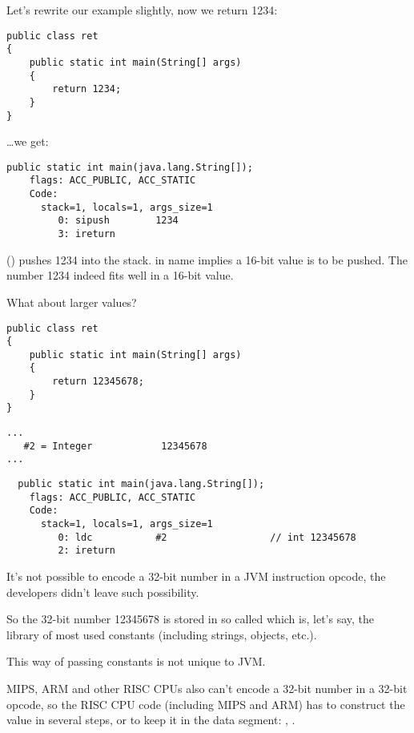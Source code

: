Let's rewrite our example slightly, now we return 1234:

\begin{lstlisting}[style=customjava]
public class ret
{
	public static int main(String[] args)
	{
		return 1234;
	}
}
\end{lstlisting}

\dots we get:

\begin{lstlisting}[caption=JDK 1.7 (excerpt)]
  public static int main(java.lang.String[]);
    flags: ACC_PUBLIC, ACC_STATIC
    Code:
      stack=1, locals=1, args_size=1
         0: sipush        1234
         3: ireturn       
\end{lstlisting}

 () pushes 1234 into the stack.
 in name implies a 16-bit value is to be pushed. 
The number 1234 indeed fits well in a 16-bit value.

What about larger values?

\begin{lstlisting}[style=customjava]
public class ret
{
	public static int main(String[] args) 
	{
		return 12345678;
	}
}
\end{lstlisting}

\begin{lstlisting}[caption=Constant pool]
...
   #2 = Integer            12345678
...
\end{lstlisting}

\begin{lstlisting}
  public static int main(java.lang.String[]);
    flags: ACC_PUBLIC, ACC_STATIC
    Code:
      stack=1, locals=1, args_size=1
         0: ldc           #2                  // int 12345678
         2: ireturn       
\end{lstlisting}

It's not possible to encode a 32-bit number in a JVM instruction opcode, 
the developers didn't leave such possibility.

So the 32-bit number 12345678 is stored in so called  which is, let's say,
the library of most used constants (including strings, objects, etc.).

This way of passing constants is not unique to JVM.

MIPS, ARM and other RISC CPUs also can't encode a 32-bit number
in a 32-bit opcode, so the RISC CPU code (including MIPS and ARM) has to construct the value 
in several steps, or to keep it in the data segment:
, .

